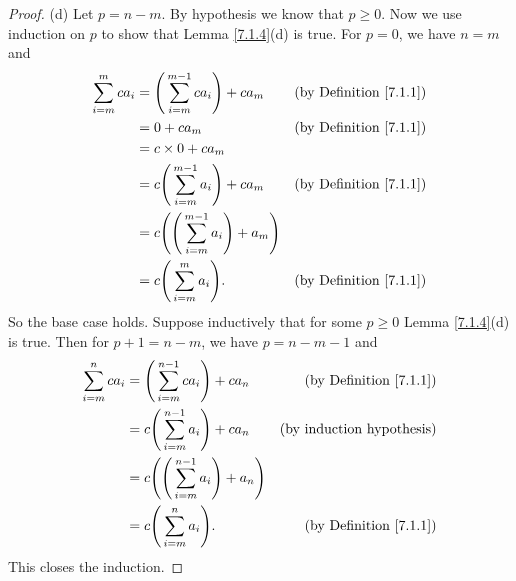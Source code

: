 \begin{proof}{(d)}
    Let \(p = n - m\).
    By hypothesis we know that \(p \geq 0\).
    Now we use induction on \(p\) to show that Lemma \ref{7.1.4}(d) is true.
    For \(p = 0\), we have \(n = m\) and
    \begin{align*}
        \sum_{i = m}^m ca_i & = \Bigg(\sum_{i = m}^{m - 1} ca_i\Bigg) + ca_m             & \text{(by Definition \ref{7.1.1})} \\
                            & = 0 + ca_m                                                 & \text{(by Definition \ref{7.1.1})} \\
                            & = c \times 0 + ca_m                                                                             \\
                            & = c \Bigg(\sum_{i = m}^{m - 1} a_i\Bigg) + ca_m            & \text{(by Definition \ref{7.1.1})} \\
                            & = c \Bigg(\Bigg(\sum_{i = m}^{m - 1} a_i\Bigg) + a_m\Bigg)                                      \\
                            & = c \Bigg(\sum_{i = m}^m a_i\Bigg).                        & \text{(by Definition \ref{7.1.1})}
    \end{align*}
    So the base case holds.
    Suppose inductively that for some \(p \geq 0\) Lemma \ref{7.1.4}(d) is true.
    Then for \(p + 1 = n - m\), we have \(p = n - m - 1\) and
    \begin{align*}
        \sum_{i = m}^n ca_i & = \Bigg(\sum_{i = m}^{n - 1} ca_i\Bigg) + ca_n             & \text{(by Definition \ref{7.1.1})} \\
                            & = c \Bigg(\sum_{i = m}^{n - 1} a_i\Bigg) + ca_n            & \text{(by induction hypothesis)}   \\
                            & = c \Bigg(\Bigg(\sum_{i = m}^{n - 1} a_i\Bigg) + a_n\Bigg)                                      \\
                            & = c \Bigg(\sum_{i = m}^n a_i\Bigg).                        & \text{(by Definition \ref{7.1.1})}
    \end{align*}
    This closes the induction.
\end{proof}

